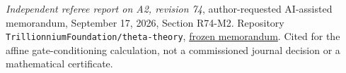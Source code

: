 \emph{Independent referee report on A2, revision 74},
author-requested AI-assisted memorandum, September 17, 2026,
Section R74-M2. Repository
\texttt{Trillionnium\allowbreak Foundation/\allowbreak theta-theory},
\href{https://github.com/TrillionniumFoundation/theta-theory/blob/1ad828fd3cec7d39881fa4bb31d14423c4fd35da/reviews/a2-v74-independent-harsh-top4-2026-09-17/REFEREE_REPORT.md}{frozen memorandum}.
Cited for the affine gate-conditioning calculation, not a commissioned
journal decision or a mathematical certificate.
